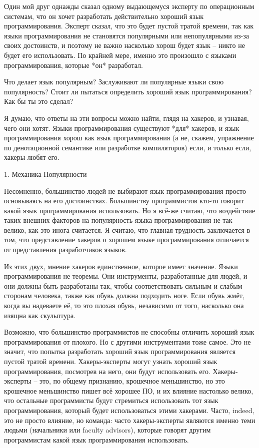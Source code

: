 \documentclass[ebook,12pt,oneside,openany]{memoir}
\begin{document}
\maketitle

Один мой друг однажды сказал одному выдающемуся эксперту по
операционным системам, что он хочет разработать действительно хороший
язык программирования. Эксперт сказал, что это будет пустой тратой
времени, так как языки программирования не становятся популярными или
непопулярными из-за своих достоинств, и поэтому не важно насколько
хорош будет язык -- никто не будет его использовать. По крайней мере,
именно это произошло с языками программирования, которые *он*
разработал.

Что делает язык популярным? Заслуживают ли популярные языки свою
популярность? Стоит ли пытаться определить хороший язык
программирования? Как бы ты это сделал?

Я думаю, что ответы на эти вопросы можно найти, глядя на хакеров, и
узнавая, чего они хотят. Языки программирования существуют *для*
хакеров, и язык программирования хорош как язык программирования (а
не, скажем, упражнение по денотационной семантике или разработке
компиляторов) если, и только если, хакеры любят его.

1. Механика Популярности

Несомненно, большинство людей не выбирают язык программирования просто
основываясь на его достоинствах. Большинству программистов кто-то
говорит какой язык программирования использовать. Но я всё-же считаю,
что воздействие таких внешних факторов на популярность языка
программирования не так велико, как это инога считается. Я считаю, что
главная трудность заключается в том, что представление хакеров о
хорошем языке программирования отличается от представления
разработчиков языков.

Из этих двух, мнение хакеров единственное, которое имеет значение.
Языки программирования не теоремы. Они инструменты, разработанные для
людей, и они должны быть разработаны так, чтобы соответствовать
сильным и слабым сторонам человека, также как обувь должна подходить
ноге. Если обувь жмёт, когда вы надеваете её, то это плохая обувь,
независимо от того, насколько она изящна как скульптура.

Возможно, что большинство программистов не способны отличить хороший
язык программирования от плохого. Но с другими инструментами тоже
самое. Это не значит, что попытка разработать хороший язык
программирования является пустой тратой времени. Хакеры-эксперты могут
узнать хороший язык программирования, посмотрев на него, они будут
использовать его. Хакеры-эксперты -- это, по общему признанию,
крошечное меньшинство, но это крошечное меньшинство пишет всё хорошее
ПО, и их влияние настолько велико, что остальные программисты будут
стремиться использовать тот язык программирования, который будет
использоваться этими хакерами. Часто, indeed, это не просто влияние,
но команда: часто хакеры-эксперты являются именно теми людьми
(начальники или faculty advisors), которые говорят другим
программистам какой язык программирования использовать.
\end{document}
